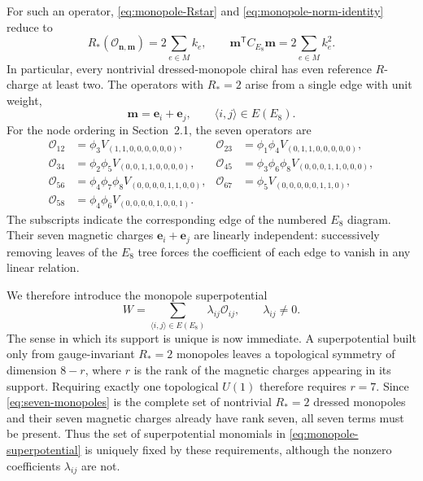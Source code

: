 \documentclass[11pt,a4paper]{article}
\numberwithin{equation}{section}
\begin{document}
For such an operator, \eqref{eq:monopole-Rstar} and \eqref{eq:monopole-norm-identity} reduce to
\begin{equation}
  R_*(\mathcal O_{\boldsymbol n,\boldsymbol m})
  =2\sum_{e\in M}k_e,
  \qquad
  \boldsymbol m^{\mathsf T}C_{E_8}\boldsymbol m
  =2\sum_{e\in M}k_e^2.
  \label{eq:matching-charges}
\end{equation}
In particular, every nontrivial dressed-monopole chiral has even reference $R$-charge at least two.  The operators with $R_*=2$ arise from a single edge with unit weight,
\begin{equation}
  \boldsymbol m=\boldsymbol e_i+\boldsymbol e_j,
  \qquad
  \langle i,j\rangle\in E(E_8).
  \label{eq:edge-flux}
\end{equation}
For the node ordering in Section~2.1, the seven operators are
\begin{align}
  \mathcal O_{12}&=\phi_3V_{(1,1,0,0,0,0,0,0)},
  &
  \mathcal O_{23}&=\phi_1\phi_4V_{(0,1,1,0,0,0,0,0)},\nonumber\\
  \mathcal O_{34}&=\phi_2\phi_5V_{(0,0,1,1,0,0,0,0)},
  &
  \mathcal O_{45}&=\phi_3\phi_6\phi_8V_{(0,0,0,1,1,0,0,0)},\nonumber\\
  \mathcal O_{56}&=\phi_4\phi_7\phi_8V_{(0,0,0,0,1,1,0,0)},
  &
  \mathcal O_{67}&=\phi_5V_{(0,0,0,0,0,1,1,0)},\nonumber\\
  \mathcal O_{58}&=\phi_4\phi_6V_{(0,0,0,0,1,0,0,1)}.
  \label{eq:seven-monopoles}
\end{align}
The subscripts indicate the corresponding edge of the numbered $E_8$ diagram.  Their seven magnetic charges $\boldsymbol e_i+\boldsymbol e_j$ are linearly independent: successively removing leaves of the $E_8$ tree forces the coefficient of each edge to vanish in any linear relation.

We therefore introduce the monopole superpotential
\begin{equation}
  W
  =\sum_{\langle i,j\rangle\in E(E_8)}
  \lambda_{ij}\mathcal O_{ij},
  \qquad
  \lambda_{ij}\neq0.
  \label{eq:monopole-superpotential}
\end{equation}
The sense in which its support is unique is now immediate.  A superpotential built only from gauge-invariant $R_*=2$ monopoles leaves a topological symmetry of dimension $8-r$, where $r$ is the rank of the magnetic charges appearing in its support.  Requiring exactly one topological $U(1)$ therefore requires $r=7$.  Since \eqref{eq:seven-monopoles} is the complete set of nontrivial $R_*=2$ dressed monopoles and their seven magnetic charges already have rank seven, all seven terms must be present.  Thus the set of superpotential monomials in \eqref{eq:monopole-superpotential} is uniquely fixed by these requirements, although the nonzero coefficients $\lambda_{ij}$ are not.
\end{document}
